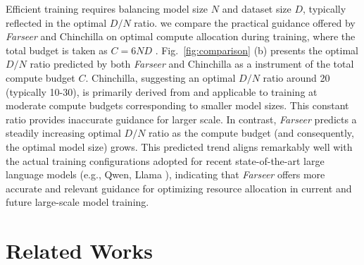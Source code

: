 \documentclass{article}
\begin{document}
Efficient training requires balancing model size $N$ and dataset size 
$D$, typically reflected in the optimal $D/N$ ratio. we compare the practical guidance offered by \textit{Farseer} and Chinchilla on optimal compute allocation during training, where the total budget is taken as $C=6ND$ \cite{kaplan2020scaling, hoffmann_training_2022}.
Fig.~\ref{fig:comparison} (b) presents the optimal $D/N$ ratio predicted by both \textit{Farseer} and Chinchilla as a instrument of the total compute budget $C$. 
Chinchilla, suggesting an optimal $D/N$ ratio around 20 (typically 10-30), is primarily derived from and applicable to training at moderate compute budgets corresponding to smaller model sizes. This constant ratio provides inaccurate guidance for larger scale. 
In contrast, \textit{Farseer} predicts a steadily increasing optimal $D/N$ ratio as the compute budget (and consequently, the optimal model size) grows.  
This predicted trend aligns remarkably well with the actual training configurations adopted for recent state-of-the-art large language models (e.g., Qwen\cite{Yang2024, qwen3}, Llama \cite{Touvron2023a,  Touvron2023b, Grattafiori2024}), indicating that \textit{Farseer} offers more accurate and relevant guidance for optimizing resource allocation in current and future large-scale model training.


\section{Related Works}
\end{document}
